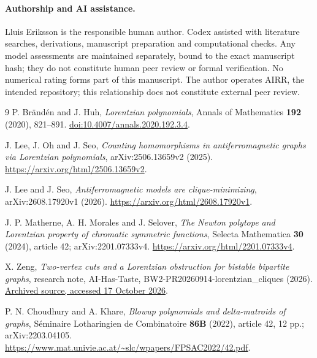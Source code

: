 \documentclass[11pt]{article}
\theoremstyle{remark}
\begin{document}
\paragraph{Authorship and AI assistance.}
Lluis Eriksson is the responsible human author. Codex assisted with
literature searches, derivations, manuscript preparation and
computational checks. Any model assessments are maintained separately,
bound to the exact manuscript hash; they do not constitute human peer
review or formal verification. No numerical rating forms part of this
manuscript.
The author operates AIRR, the intended repository; this relationship
does not constitute external peer review.

\clearpage
\begin{thebibliography}{9}
P. Br\"and\'en and J. Huh,
\emph{Lorentzian polynomials},
Annals of Mathematics \textbf{192} (2020), 821--891.
\href{https://doi.org/10.4007/annals.2020.192.3.4}
{doi:10.4007/annals.2020.192.3.4}.

J. Lee, J. Oh and J. Seo,
\emph{Counting homomorphisms in antiferromagnetic graphs via
Lorentzian polynomials}, arXiv:2506.13659v2 (2025).
\url{https://arxiv.org/html/2506.13659v2}.

J. Lee and J. Seo,
\emph{Antiferromagnetic models are clique-minimizing},
arXiv:2608.17920v1 (2026).
\url{https://arxiv.org/html/2608.17920v1}.

J. P. Matherne, A. H. Morales and J. Selover,
\emph{The Newton polytope and Lorentzian property of chromatic
symmetric functions},
Selecta Mathematica \textbf{30} (2024), article 42;
arXiv:2201.07333v4.
\url{https://arxiv.org/html/2201.07333v4}.

X. Zeng,
\emph{Two-vertex cuts and a Lorentzian obstruction for bistable
bipartite graphs}, research note, AI-Has-Taste,
BW2-PR20260914-lorentzian\_cliques (2026).
\href{https://github.com/ArtificialZeng/AI-Has-Taste/blob/f3ae144b74f238f22c2b84b5283cb14ce912fd33/reproducible_source_code/BigWIN2/BW2-PR20260914-lorentzian_cliques/source/manuscript/main.tex}{Archived source, accessed 17 October 2026}.

P. N. Choudhury and A. Khare,
\emph{Blowup polynomials and delta-matroids of graphs},
S\'eminaire Lotharingien de Combinatoire \textbf{86B} (2022),
article 42, 12 pp.; arXiv:2203.04105.
\url{https://www.mat.univie.ac.at/~slc/wpapers/FPSAC2022/42.pdf}.

\end{thebibliography}
\end{document}
